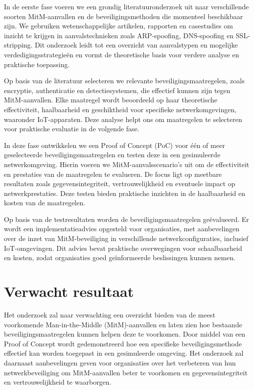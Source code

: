 In de eerste fase voeren we een grondig literatuuronderzoek uit naar verschillende soorten MitM-aanvallen en de beveiligingsmethoden die momenteel beschikbaar zijn. We gebruiken wetenschappelijke artikelen, rapporten en casestudies om inzicht te krijgen in aanvalstechnieken zoals ARP-spoofing, DNS-spoofing en SSL-stripping. Dit onderzoek leidt tot een overzicht van aanvalstypen en mogelijke verdedigingsstrategieën en vormt de theoretische basis voor verdere analyse en praktische toepassing.


Op basis van de literatuur selecteren we relevante beveiligingsmaatregelen, zoals encryptie, authenticatie en detectiesystemen, die effectief kunnen zijn tegen MitM-aanvallen. Elke maatregel wordt beoordeeld op haar theoretische effectiviteit, haalbaarheid en geschiktheid voor specifieke netwerkomgevingen, waaronder IoT-apparaten. Deze analyse helpt ons om maatregelen te selecteren voor praktische evaluatie in de volgende fase.

In deze fase ontwikkelen we een Proof of Concept (PoC) voor één of meer geselecteerde beveiligingsmaatregelen en testen deze in een gesimuleerde netwerkomgeving. Hierin voeren we MitM-aanvalsscenario's uit om de effectiviteit en prestaties van de maatregelen te evalueren. De focus ligt op meetbare resultaten zoals gegevensintegriteit, vertrouwelijkheid en eventuele impact op netwerkprestaties. Deze testen bieden praktische inzichten in de haalbaarheid en kosten van de maatregelen.


Op basis van de testresultaten worden de beveiligingsmaatregelen geëvalueerd. Er wordt een implementatieadvies opgesteld voor organisaties, met aanbevelingen over de inzet van MitM-beveiliging in verschillende netwerkconfiguraties, inclusief IoT-omgevingen. Dit advies bevat praktische overwegingen voor schaalbaarheid en kosten, zodat organisaties goed geïnformeerde beslissingen kunnen nemen.


\section{Verwacht resultaat}%
\label{sec:verwachte_resultaten}

Het onderzoek zal naar verwachting een overzicht bieden van de meest voorkomende Man-in-the-Middle (MitM)-aanvallen en laten zien hoe bestaande beveiligingsmaatregelen kunnen helpen deze te voorkomen. Door middel van een Proof of Concept wordt gedemonstreerd hoe een specifieke beveiligingsmethode effectief kan worden toegepast in een gesimuleerde omgeving. Het onderzoek zal daarnaast aanbevelingen geven voor organisaties over het verbeteren van hun netwerkbeveiliging om MitM-aanvallen beter te voorkomen en gegevensintegriteit en vertrouwelijkheid te waarborgen.
